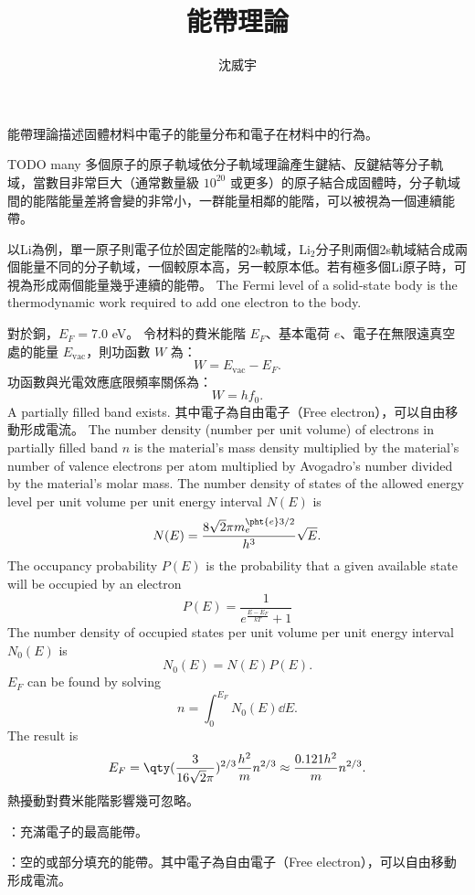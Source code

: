 \documentclass[a4paper,12pt]{article}
\begin{document}
\title{能帶理論}
\author{沈威宇}
\date{\temtoday}
\titletocdoc
{}
能帶理論描述固體材料中電子的能量分布和電子在材料中的行為。

TODO many
多個原子的原子軌域依分子軌域理論產生鍵結、反鍵結等分子軌域，當數目非常巨大（通常數量級 $10^{20}$ 或更多）的原子結合成固體時，分子軌域間的能階能量差將會變的非常小，一群能量相鄰的能階，可以被視為一個連續能帶。

以Li為例，單一原子則電子位於固定能階的2s軌域，Li$_2$分子則兩個2s軌域結合成兩個能量不同的分子軌域，一個較原本高，另一較原本低。若有極多個Li原子時，可視為形成兩個能量幾乎連續的能帶。
The Fermi level of a solid-state body is the thermodynamic work required to add one electron to the body.

對於銅，$E_F=7.0$ eV。
令材料的費米能階 $E_F$、基本電荷 $e$、電子在無限遠真空處的能量 $E_{\text{vac}}$，則功函數 $W$ 為：
\[W=E_{\text{vac}}-E_F.\]
功函數與光電效應底限頻率關係為：
\[W= hf_0.\]
A partially filled band exists. 其中電子為自由電子（Free electron），可以自由移動形成電流。
The number density (number per unit volume) of electrons in partially filled band $n$ is the material's mass density multiplied by the material's number of valence electrons per atom multiplied by Avogadro's number divided by the material's molar mass.
The number density of states of the allowed energy level per unit volume per unit energy interval $N(E)$ is
\[N(E)=\frac{8\sqrt{2}\pi m_e^{\pht{e}3/2}}{h^3}\sqrt{E}.\]
The occupancy probability $P(E)$ is the probability that a given available state will be occupied by an electron
\[P(E)=\frac{1}{e^{\frac{E-E_F}{kT}}+1}\]
The number density of occupied states per unit volume per unit energy interval $N_0(E)$ is
\[N_0(E)=N(E)P(E).\]
$E_F$ can be found by solving
\[n=\int_0^{E_F}N_0(E)\dd{E}.\]
The result is
\[E_F=\qty(\frac{3}{16\sqrt{2}\pi})^{2/3}\frac{h^2}{m}n^{2/3}\approx\frac{0.121h^2}{m}n^{2/3}.\]
熱擾動對費米能階影響幾可忽略。
\bit
\item{}：充滿電子的最高能帶。
\item{}：空的或部分填充的能帶。其中電子為自由電子（Free electron），可以自由移動形成電流。
\end{document}
